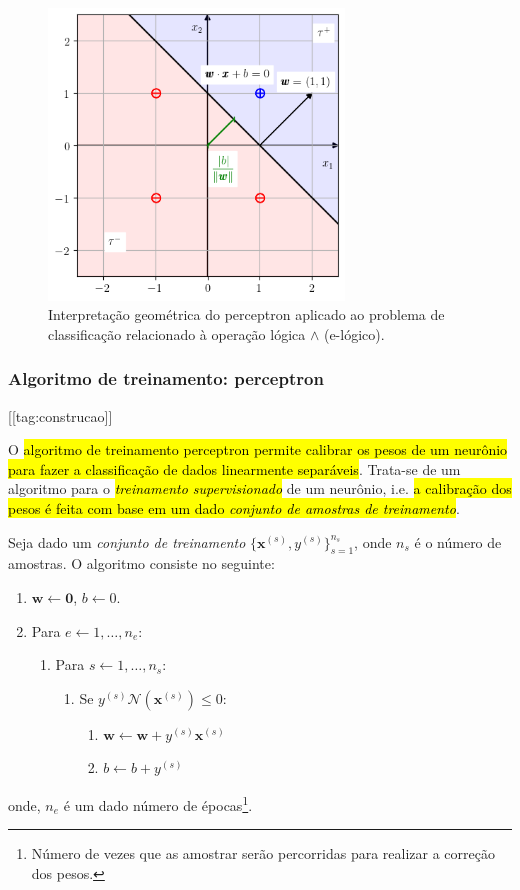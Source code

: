 \begin{figure}[H]
  \centering
  \includegraphics[width=0.7\textwidth]{./cap_perceptron/dados/fig_class_e/main}
  \caption{Interpretação geométrica do perceptron aplicado ao problema de classificação relacionado à operação lógica $\land$ (e-lógico).}
  \label{fig:class_e}
\end{figure}

\subsubsection{Algoritmo de treinamento: perceptron}
[[tag:construcao]]

O \hl{algoritmo de treinamento perceptron permite calibrar os pesos de um neurônio para fazer a classificação de dados linearmente separáveis}. Trata-se de um algoritmo para o \hl{\emph{treinamento supervisionado}} de um neurônio, i.e. \hl{a calibração dos pesos é feita com base em um dado \emph{conjunto de amostras de treinamento}}.

Seja dado um \emph{conjunto de treinamento} $\{\pmb{x}^{(s)},y^{(s)}\}_{s=1}^{n_s}$, onde $n_s$ é o número de amostras. O algoritmo consiste no seguinte:
\begin{enumerate}
\item $\pmb{w} \leftarrow\pmb{0}$, $b \leftarrow 0$.
\item Para $e \leftarrow 1,\dotsc, n_e$:
  \begin{enumerate}
  \item Para $s \leftarrow 1,\dotsc, n_s$:
    \begin{enumerate}
    \item Se $y^{(s)}\mathcal{N}\left(\pmb{x}^{(s)}\right) \leq 0$:
      \begin{enumerate}
      \item $\pmb{w} \leftarrow \pmb{w}+y^{(s)}\pmb{x}^{(s)}$
      \item $b \leftarrow b + y^{(s)}$
      \end{enumerate}
    \end{enumerate}
  \end{enumerate}
\end{enumerate}
onde, $n_e$ é um dado número de épocas\footnote{Número de vezes que as amostrar serão percorridas para realizar a correção dos pesos.}.

